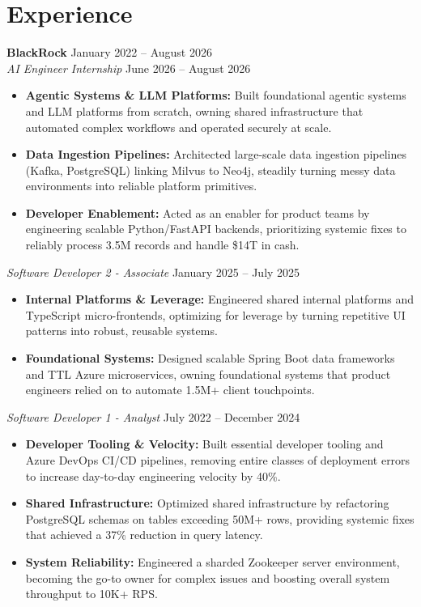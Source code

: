 \documentclass[11pt,a4paper]{article}
\begin{document}
\section{Experience}
\noindent
\textbf{BlackRock} \hfill January 2022 -- August 2026 \\
\textit{AI Engineer Internship} \hfill June 2026 -- August 2026
\begin{itemize}[leftmargin=*,noitemsep,topsep=0pt]
    \item \textbf{Agentic Systems \& LLM Platforms:} Built foundational agentic systems and LLM platforms from scratch, owning shared infrastructure that automated complex workflows and operated securely at scale.
    \item \textbf{Data Ingestion Pipelines:} Architected large-scale data ingestion pipelines (Kafka, PostgreSQL) linking Milvus to Neo4j, steadily turning messy data environments into reliable platform primitives.
    \item \textbf{Developer Enablement:} Acted as an enabler for product teams by engineering scalable Python/FastAPI backends, prioritizing systemic fixes to reliably process 3.5M records and handle \$14T in cash.
\end{itemize}

\vspace{3pt}
\noindent
\textit{Software Developer 2 - Associate} \hfill January 2025 -- July 2025
\begin{itemize}[leftmargin=*,noitemsep,topsep=0pt]
    \item \textbf{Internal Platforms \& Leverage:} Engineered shared internal platforms and TypeScript micro-frontends, optimizing for leverage by turning repetitive UI patterns into robust, reusable systems.
    \item \textbf{Foundational Systems:} Designed scalable Spring Boot data frameworks and TTL Azure microservices, owning foundational systems that product engineers relied on to automate 1.5M+ client touchpoints.
\end{itemize}

\vspace{3pt}
\noindent
\textit{Software Developer 1 - Analyst} \hfill July 2022 -- December 2024
\begin{itemize}[leftmargin=*,noitemsep,topsep=0pt]
    \item \textbf{Developer Tooling \& Velocity:} Built essential developer tooling and Azure DevOps CI/CD pipelines, removing entire classes of deployment errors to increase day-to-day engineering velocity by 40\%.
    \item \textbf{Shared Infrastructure:} Optimized shared infrastructure by refactoring PostgreSQL schemas on tables exceeding 50M+ rows, providing systemic fixes that achieved a 37\% reduction in query latency.
    \item \textbf{System Reliability:} Engineered a sharded Zookeeper server environment, becoming the go-to owner for complex issues and boosting overall system throughput to 10K+ RPS.
\end{itemize}
\end{document}
